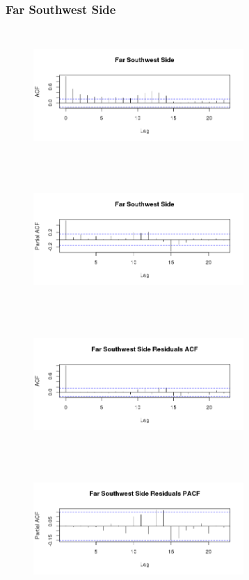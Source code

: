 \documentclass{article} %
\begin{document}
\subsubsection{Far Southwest Side}
\begin{multicols}{2} 
\begin{figure}[H]
\includegraphics[height=50mm, width=80mm]{Plots/far_southwest_acf.png}
\end{figure}
 
\begin{figure}[H]
\includegraphics[height=50mm, width=80mm]{Plots/far_southwest_pacf.png}
\end{figure}
 
\begin{figure}[H]
\includegraphics[height=50mm, width=80mm]{Plots/far_southwest_resid_acf.png}
\end{figure}
 
\begin{figure}[H]
\includegraphics[height=50mm, width=80mm]{Plots/far_southwest_resid_pacf.png}
\end{figure}
 
\end{multicols}
 
\end{document}
